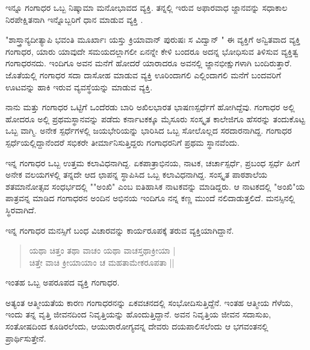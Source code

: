 ಇನ್ನೂ ಗಂಗಾಧರ ಒಬ್ಬ ನಿಷ್ಕಾಮಾ ಮನೋಭಾವದ ವ್ಯಕ್ತಿ. ತನ್ನಲ್ಲಿ ಇರುವ ಅಫಾರವಾಧ ಜ್ಙಾನವನ್ನು ಸಧಾಕಾಲ ನಿರಪೇಕ್ಷಿತನಾಗಿ  ಇನ್ನೊಬ್ಬರಿಗೆ ಧಾನ ಮಾಡುವ ವ್ಯಕ್ತಿ .

"ಶಾಸ್ತ್ರಾನ್ಯದೀತ್ಯಾಪಿ ಭವಂತಿ ಮೂರ್ಖಾಃ ಯಸ್ತು ಕ್ರಿಯಾವಾನ್ ಪುರುಷಃ ಸ ವಿದ್ವಾನ್ " ಈ ವ್ಯಕ್ತಿಗೆ ಅನ್ವಿತವಾದ ವ್ಯಕ್ತಿ ಗಂಗಾಧರ, ಯಾರು ಯಾವುದೇ ಸಮಯದಲ್ಲಾಗಲೀ ಏನನ್ನೇ ಕೇಳಿ ಬಂದರೂ  ಅದನ್ನ ಭೋಧಿಸುವ ತಿಳಿಸುವ ವ್ಯಕ್ತಿತ್ವ ಗಂಗಾಧರನದು.  ಇಂದಿಗೂ ಅವನ ಮನೆಗೆ ಹೋದರೆ ಯಾರಾದರೂ  ಅವನಲ್ಲಿ ಜ್ಙಾನಭೀಕ್ಷುಗಳಾಗಿ ಬಂದಿರುತ್ತಾರೆ. ಜೊತೆಯಲ್ಲಿ ಗಂಗಾಧರ ಸದಾ ದಾಸೋಹ ಮಾಡುವ ವ್ಯಕ್ತಿ ಊರಿಂದಾಗಲಿ ಎಲ್ಲಿಂದಾಗಲಿ  ಮನೆಗೆ ಬಂದವರಿಗೆ ಊಟವನ್ನು ಹಾಕಿ ಇರುವ ವ್ಯವಸ್ಥೆಯನ್ನು  ಮಾಡುವ ವ್ಯಕ್ತಿ. 

ನಾನು ಮತ್ತು ಗಂಗಾಧರ ಒಟ್ಟಿಗೆ ಒಂದೆರಡು ಬಾರಿ ಅಖಿಲಭಾರತ ಭಾಷಣಸ್ಪರ್ಧೆಗೆ ಹೋಗಿದ್ದೆವು. ಗಂಗಾಧರ ಅಲ್ಲಿ ಹೋದರೂ ಅಲ್ಲಿ ಪ್ರಥಮಸ್ಥಾನವನ್ನು ಪಡೆದು ಕರ್ನಾಟಕಕ್ಕೂ ಮೈಸೂರು ಸಂಸ್ಕೃತ ಕಾಲೇಜಿಗೂ ಹೆಸರನ್ನು ತಂದುಕೊಟ್ಟ ಒಬ್ಬ ವಾಗ್ಮಿ. ಅನೇಕ ಸ್ಪರ್ಧೆಗಳಲ್ಲಿ ಜಯಭೇರಿಯನ್ನು ಭಾರಿಸಿದ ಒಬ್ಬ ಸೋಲೊಲ್ಲದ ಸರದಾರನಾಗಿದ್ದ. ಗಂಗಾಧರ ಸ್ಪರ್ಧೆಯಲ್ಲಿದ್ದಾನೆಂದರೆ ಸಭಿಕರೇ ತೀರ್ಮಾನಿಸುತ್ತಿದ್ದರು ಗಂಗಾಧರನಿಗೆ ಪ್ರಥಮ ಸ್ಥಾನವೆಂದು. 

ಇನ್ನ ಗಂಗಾಧರ  ಒಬ್ಬ ಉತ್ತಮ ಕಲಾವಿಧನಾಗಿದ್ದ. ಏಕಪಾತ್ರಾಭಿನಯ, ನಾಟಕ, ಚರ್ಚಾಸ್ಪರ್ಧೆ, ಪ್ರಬಂಧ ಸ್ಪರ್ಧೆ ಹೀಗೆ    ಅನೇಕ ವಲಯಗಳಲ್ಲಿ ತನ್ನದೇ ಆದ ಛಾಪನ್ನ ಸ್ಥಾಪಿಸಿದ ಒಬ್ಬ ಕಲಾವಿಧನಾಗಿದ್ದ. ಸಂಸ್ಕೃತ ಪಾಠಶಾಲೆಯ ಶತಮಾನೋತ್ಸವ ಸಂಧರ್ಭದಲ್ಲಿ ""ಅಂಖಿ" ಎಂಬ ಐತಿಹಾಸಿಕ ನಾಟಕವನ್ನು ಮಾಡಿದ್ದರು. ಆ ನಾಟಕದಲ್ಲಿ "ಅಂಖಿ"ಯ ಪಾತ್ರವನ್ನ ಮಾಡಿದ ಗಂಗಾಧರನ ಅಂದಿನ ಅಭಿನಯ ಇಂದಿಗೂ ನನ್ನ ಕಣ್ಣ ಮುಂದೆ ನಲಿದಾಡುತ್ತಲಿದೆ. ಮನಸ್ಸಿನಲ್ಲಿ ಸ್ಥಿರವಾಗಿದೆ.

ಇನ್ನ ಗಂಗಾಧರ ಮನಸ್ಸಿಗೆ ಬಂಧ ವಿಚಾರವನ್ನು ಕಾರ್ಯರೂಪಕ್ಕೆ ತರುವ ವ್ಯಕ್ತಿಯಾಗಿದ್ದಾನೆ.

\begin{verse}
ಯಥಾ ಚಿತ್ತಂ  ತಥಾ ವಾಚಂ ಯಥಾ ವಾಚಸ್ತಥಾಕ್ರೀಯಾ  |\\
ಚಿತ್ತೇ ವಾಚಿ ಕ್ರೀಯಾಯಾಂ  ಚ ಮಹತಾಮೇಕರೂಪತಾ ||
\end{verse}

ಇಂತಹ ಒಬ್ಬ ಅಪರೂಪದ ವ್ಯಕ್ತಿ ಗಂಗಾಧರ.        

ಅತ್ಯಂತ ಆತ್ಮೀಯತೆಯ ಕಾರಣ ಗಂಗಾಧರನನ್ನು  ಏಕವಚನದಲ್ಲಿ ಸಂಭೋದಿಸುತ್ತಿದ್ದೆನೆ. ಇಂತಹ ಆತ್ಮೀಯ ಗೆಳೆಯ, ಇಂದು ತನ್ನ ವೃತ್ತಿ ಜೀವನದಿಂದ ನಿವೃತ್ತಿಯನ್ನು ಹೊಂದುತ್ತಿದ್ದಾನೆ. ಅವನ ನಿವೃತ್ತಿಯ ಜೀವನ ಸದಾಸುಖ, ಸಂತೋಷದಿಂದ ಕೂಡಿರಲೆಂದು, ಆಯುರಾರೋಗ್ಯವನ್ನ ದೇವರು ದಯಪಾಲಿಸಲೆಂದು ಆ ಭಗವಂತನಲ್ಲಿ ಪ್ರಾರ್ಥಿಸುತ್ತೇನೆ. 

										
